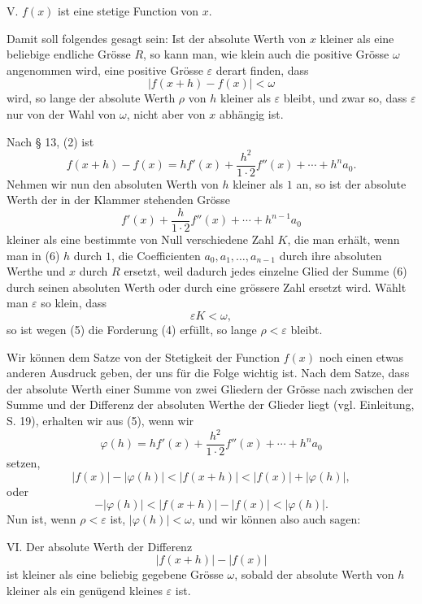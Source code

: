 \documentclass[11pt]{article}
\begin{document}
\medskip
\noindent V. $f(x)$ ist eine stetige Function von $x$.
\medskip

Damit soll folgendes gesagt sein: Ist der absolute Werth von $x$ kleiner als eine beliebige endliche Grösse $R$, so kann man, wie klein auch die positive Grösse $\omega$ angenommen wird, eine positive Grösse $\varepsilon$ derart finden, dass
\begin{equation}
 |f(x+h)-f(x)|<\omega
\tag{4}
\end{equation}
wird, so lange der absolute Werth $\rho$ von $h$ kleiner als $\varepsilon$ bleibt, und zwar so, dass $\varepsilon$ nur von der Wahl von $\omega$, nicht aber von $x$ abhängig ist.

Nach § 13, (2) ist
\begin{equation}
 f(x+h)-f(x)=h f'(x)+\frac{h^2}{1\cdot2}f''(x)+\cdots+h^n a_0.
\tag{5}
\end{equation}
Nehmen wir nun den absoluten Werth von $h$ kleiner als $1$ an, so ist der absolute Werth der in der Klammer stehenden Grösse
\begin{equation}
 f'(x)+\frac{h}{1\cdot2}f''(x)+\cdots+h^{n-1}a_0
\tag{6}
\end{equation}
kleiner als eine bestimmte von Null verschiedene Zahl $K$, die man erhält, wenn man in (6) $h$ durch $1$, die Coefficienten $a_0,a_1,\ldots,a_{n-1}$ durch ihre absoluten Werthe und $x$ durch $R$ ersetzt, weil dadurch jedes einzelne Glied der Summe (6) durch seinen absoluten Werth oder durch eine grössere Zahl ersetzt wird. Wählt man $\varepsilon$ so klein, dass
\[
 \varepsilon K<\omega,
\]
so ist wegen (5) die Forderung (4) erfüllt, so lange $\rho<\varepsilon$ bleibt.

Wir können dem Satze von der Stetigkeit der Function $f(x)$ noch einen etwas anderen Ausdruck geben, der uns für die Folge wichtig ist. Nach dem Satze, dass der absolute Werth einer Summe von zwei Gliedern der Grösse nach zwischen der Summe und der Differenz der absoluten Werthe der Glieder liegt (vgl. Einleitung, S. 19), erhalten wir aus (5), wenn wir
\[
 \varphi(h)=h f'(x)+\frac{h^2}{1\cdot2}f''(x)+\cdots+h^n a_0
\]
setzen,
\[
 |f(x)|-|\varphi(h)|<|f(x+h)|<|f(x)|+|\varphi(h)|,
\]
oder
\[
 -|\varphi(h)|<|f(x+h)|-|f(x)|<|\varphi(h)|.
\]
Nun ist, wenn $\rho<\varepsilon$ ist, $|\varphi(h)|<\omega$, und wir können also auch sagen:

\medskip
\noindent VI. Der absolute Werth der Differenz
\[
 |f(x+h)|-|f(x)|
\]
ist kleiner als eine beliebig gegebene Grösse $\omega$, sobald der absolute Werth von $h$ kleiner als ein genügend kleines $\varepsilon$ ist.
\medskip
\end{document}
